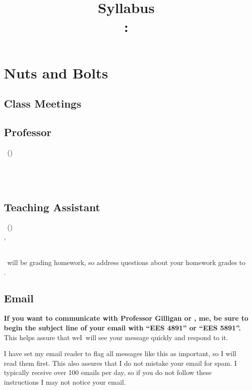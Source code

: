 \documentclass[11pt,twoside]{jgsyllabus}\usepackage[]{graphicx}\usepackage[]{xcolor}
\title{Syllabus\\
\ShortCourseNumber: \LongCourseName}
\begin{document}
\maketitle

\iffalse
\noindent
\textbf{\large \textsc{Note:} This is a draft syllabus, subject to change.}

\fi
\section[Nuts \& Bolts]{Nuts and Bolts}
\label{sec:NutsAndBolts}
\subsection{Class Meetings}
\ClassMeetings
\subsection{Professor}
\label{sec:Professor}
\ProfName\ (\ProfPronouns)\\
\ProfDescr\\
\ProfOffice\\
\ProfEmail\\
\ProfOfficeHours
%
\ifTA
\subsection{Teaching Assistant}
\label{sec:TA}
\TaName\ (\TaPronouns)\\
\TaOfficeLoc\ifTaPhone , \TaPhone\fi\\
\TaEmail\\
\TaOfficeHours
\medskip

\noindent
\TaTitle\ will be grading homework, so address questions about your homework grades
to \TaAccusative.
\fi

\subsection{Email}
\textbf{%
If you want to communicate with
\ifTA
Professor Gilligan or \TaTitle,
\else
me,
\fi
be sure to begin the
subject line of your email with ``{\scshape EES 4891}'' or ``{\scshape EES 5891}''.
}%
This helps assure
that \ifTA we\else I\fi\ will see your message quickly and respond to it.

I have set my email reader to flag all messages like this as important, so I
will read them first. This also assures that I do not mistake your email for
spam. I typically receive over 100 emails per day, so if you do not follow these
instructions I may not notice your email.
\end{document}
